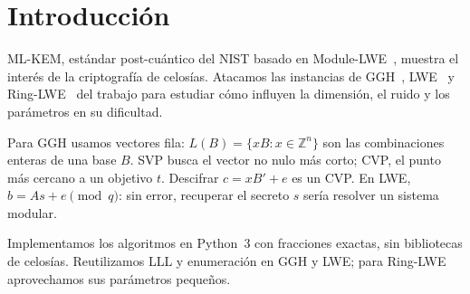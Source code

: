 \section{Introducción}
ML-KEM, estándar post-cuántico del NIST basado en Module-LWE~\cite{fips203}, muestra el interés
de la criptografía de celosías. Atacamos las instancias de GGH~\cite{ggh}, LWE~\cite{regev} y
Ring-LWE~\cite{lpr,tema11} del trabajo para estudiar cómo influyen la dimensión, el ruido y los
parámetros en su dificultad.

Para GGH usamos vectores fila: $L(B)=\{xB:x\in\mathbb Z^n\}$ son las combinaciones enteras
de una base $B$. SVP busca el vector no nulo más corto; CVP, el punto más cercano a un objetivo
$t$. Descifrar $c=xB'+e$ es un CVP. En LWE, $b=As+e\pmod q$: sin error, recuperar el secreto
$s$ sería resolver un sistema modular.

Implementamos los algoritmos en Python~3 con fracciones exactas, sin bibliotecas de celosías.
Reutilizamos LLL y enumeración en GGH y LWE; para Ring-LWE aprovechamos sus parámetros pequeños.
